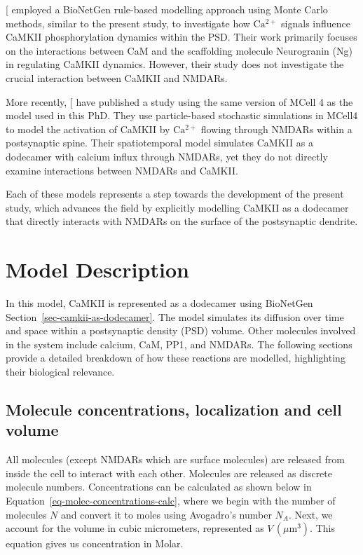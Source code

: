 \documentclass[
  11pt,
  letterpaper,
]{scrreprt}
\begin{document}
{[}\citeproc{ref-ordyan2020Interactions}{435}{]} employed a BioNetGen
rule-based modelling approach using Monte Carlo methods, similar to the
present study, to investigate how \(\mathrm{Ca^{2+}}\) signals influence
CaMKII phosphorylation dynamics within the PSD. Their work primarily
focuses on the interactions between CaM and the scaffolding molecule
Neurogranin (Ng) in regulating CaMKII dynamics. However, their study
does not investigate the crucial interaction between CaMKII and NMDARs.

More recently, {[}\citeproc{ref-bartol2024Spatial}{436}{]} have
published a study using the same version of MCell 4 as the model used in
this PhD. They use particle-based stochastic simulations in MCell4 to
model the activation of CaMKII by \(\mathrm{Ca^{2+}}\) flowing through
NMDARs within a postsynaptic spine. Their spatiotemporal model simulates
CaMKII as a dodecamer with calcium influx through NMDARs, yet they do
not directly examine interactions between NMDARs and CaMKII.

Each of these models represents a step towards the development of the
present study, which advances the field by explicitly modelling CaMKII
as a dodecamer that directly interacts with NMDARs on the surface of the
postsynaptic dendrite.

\section{Model Description}\label{model-description}

In this model, CaMKII is represented as a dodecamer using BioNetGen
Section~\ref{sec-camkii-as-dodecamer}. The model simulates its diffusion
over time and space within a postsynaptic density (PSD) volume. Other
molecules involved in the system include calcium, CaM, PP1, and NMDARs.
The following sections provide a detailed breakdown of how these
reactions are modelled, highlighting their biological relevance.

\subsection{Molecule concentrations, localization and cell
volume}\label{molecule-concentrations-localization-and-cell-volume}

All molecules (except NMDARs which are surface molecules) are released
from inside the cell to interact with each other. Molecules are released
as discrete molecule numbers. Concentrations can be calculated as shown
below in Equation~\ref{eq-molec-concentrations-calc}, where we begin
with the number of molecules \(N\) and convert it to moles using
Avogadro's number \(N_A\). Next, we account for the volume in cubic
micrometers, represented as \(V \, (\mu \text{m}^3)\). This equation
gives us concentration in Molar.
\end{document}
